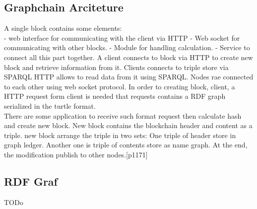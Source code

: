 \subsection{Graphchain Arciteture}

A single block contains some elements: \\
- web interface for communicating with the client via HTTP
- Web socket for communicating with other blocks.
- Module for handling calculation.
- Service to connect all this part together.
A client connects to block via HTTP to create new block and retrieve information from it. 
Clients connects to triple store via SPARQL HTTP allows to read data from it using SPARQL.
Nodes rae connected to each other using web socket protocol. In order to creating block, client, a HTTP request form client is needed that requests contains a RDF graph serialized in the turtle format.\\
There are some application to receive such format request then calculate hash and create new block.  
New block contains the blockchain header and content as a triple. new block arrange the triple in two sets: One triple of header store in graph ledger. Another one is triple of contents store as name graph. At the end, the modification publish to other nodes.[p1171]

\subsection{RDF Graf }
TODo

